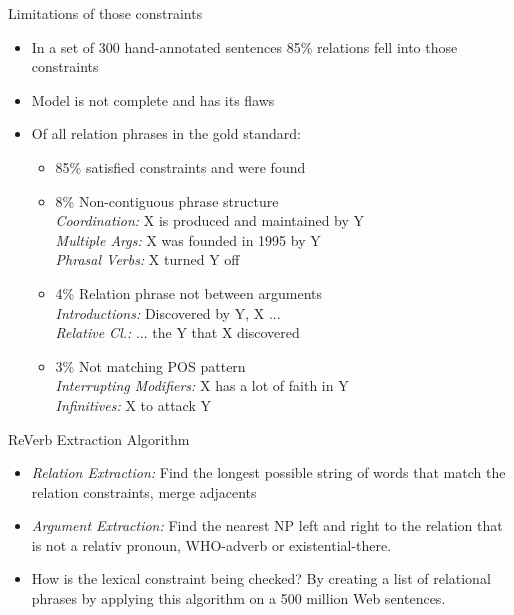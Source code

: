 \documentclass[11pt]{beamer}
\begin{document}
		\begin{frame}{Limitations of those constraints}
			\begin{center}
				\begin{itemize}
				\item In a set of 300 hand-annotated sentences 85\% relations fell into those constraints
				\item Model is not complete and has its flaws
				\item Of all relation phrases in the gold standard:
				\begin{itemize}
				\item 85\% satisfied constraints and were found
				\item 8\% Non-contiguous phrase structure\\
				\textit{Coordination:} X is produced and maintained by Y\\
				\textit{Multiple Args:} X was founded in 1995 by Y\\
				\textit{Phrasal Verbs:} X turned Y off
				\item 4\% Relation phrase not between arguments\\
				\textit{Introductions:} Discovered by Y, X ...\\
				\textit{Relative Cl.:} ... the Y that X discovered
				\item 3\% Not matching POS pattern\\
				\textit{Interrupting Modifiers:} X has a lot of faith in Y\\
				\textit{Infinitives:} X to attack Y
				\end{itemize}
				\end{itemize}
				
			\end{center}
		\end{frame}
		\begin{frame}{ReVerb Extraction Algorithm}
			\begin{center}
				\begin{itemize}
				\item \textit{Relation Extraction: }Find the longest possible string of words that match the relation constraints, merge adjacents
				\item \textit{Argument Extraction:} Find the nearest NP left and right to the relation that is not a relativ pronoun, WHO-adverb or existential-there.
				\item How is the lexical constraint being checked? By creating a list of relational phrases by applying this algorithm on a 500 million Web sentences.
				\end{itemize}
			\end{center}
		\end{frame}
\end{document}
